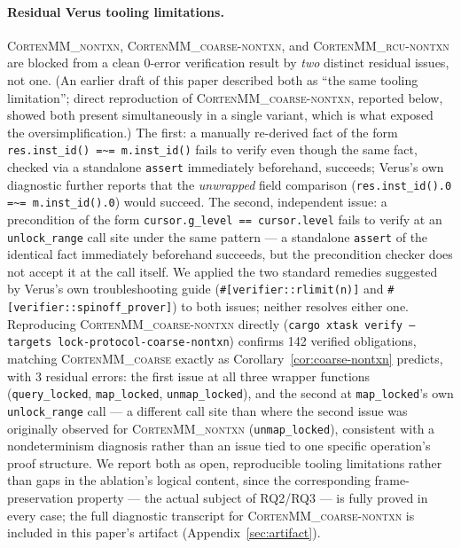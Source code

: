 \documentclass[10pt]{article}
\newcommand{\corten}[1]{\textsc{CortenMM\_#1}}
\newcommand{\vfn}[1]{\texttt{#1}}
\begin{document}
\paragraph{Residual Verus tooling limitations.} \corten{nontxn},
\corten{coarse-nontxn}, and \corten{rcu-nontxn} are blocked from a
clean $0$-error verification result by \emph{two} distinct residual
issues, not one. (An earlier draft of this paper described both as
``the same tooling limitation''; direct reproduction of
\corten{coarse-nontxn}, reported below, showed both present
simultaneously in a single variant, which is what exposed the
oversimplification.) The first: a manually re-derived fact of the form
\texttt{res.inst\_id() =\textasciitilde{}= m.inst\_id()} fails to
verify even though the same fact, checked via a standalone
\texttt{assert} immediately beforehand, succeeds; Verus's own
diagnostic further reports that the \emph{unwrapped} field comparison
(\texttt{res.inst\_id().0 =\textasciitilde{}= m.inst\_id().0}) would
succeed. The second, independent issue: a precondition of the form
\texttt{cursor.g\_level == cursor.level} fails to verify at an
\vfn{unlock\_range} call site under the same pattern --- a standalone
\texttt{assert} of the identical fact immediately beforehand succeeds,
but the precondition checker does not accept it at the call itself.
We applied the two standard remedies suggested by Verus's own
troubleshooting guide (\texttt{\#[verifier::rlimit(n)]} and
\texttt{\#[verifier::spinoff\_prover]}) to both issues; neither
resolves either one. Reproducing \corten{coarse-nontxn} directly
(\vfn{cargo xtask verify --targets lock-protocol-coarse-nontxn})
confirms 142 verified obligations, matching \corten{coarse} exactly
as Corollary~\ref{cor:coarse-nontxn} predicts, with 3 residual
errors: the first issue at all three wrapper functions
(\vfn{query\_locked}, \vfn{map\_locked}, \vfn{unmap\_locked}), and the
second at \vfn{map\_locked}'s own \vfn{unlock\_range} call --- a
different call site than where the second issue was originally
observed for \corten{nontxn} (\vfn{unmap\_locked}), consistent with a
nondeterminism diagnosis rather than an issue tied to one specific
operation's proof structure. We report both as open, reproducible
tooling limitations rather than gaps in the ablation's logical
content, since the corresponding frame-preservation property --- the
actual subject of RQ2/RQ3 --- is fully proved in every case; the full
diagnostic transcript for \corten{coarse-nontxn} is included in this
paper's artifact (Appendix~\ref{sec:artifact}).
\end{document}
